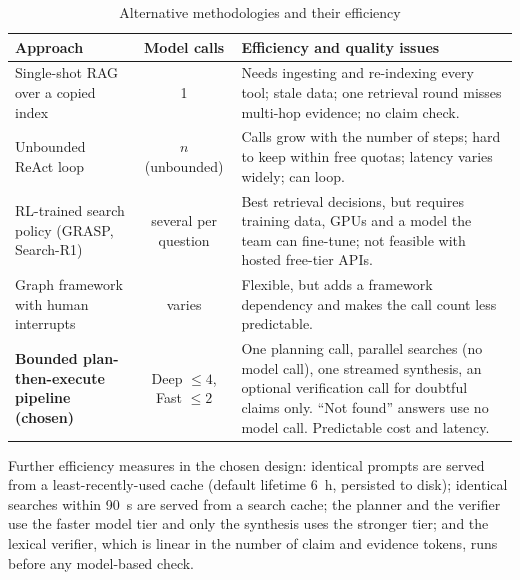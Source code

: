 \documentclass[oneside,a4paper,12pt]{report}
\begin{document}
\begin{table}[!htbp]
\begin{center}
\def\arraystretch{1.3}
\small
\begin{tabularx}{\textwidth}{| p{3.2cm} | c | X |}
\hline
Approach & Model calls & Efficiency and quality issues \\ \hline
Single-shot RAG over a copied index & 1 & Needs ingesting and re-indexing every tool; stale data; one retrieval round misses multi-hop evidence; no claim check. \\ \hline
Unbounded ReAct loop & $n$ (unbounded) & Calls grow with the number of steps; hard to keep within free quotas; latency varies widely; can loop. \\ \hline
RL-trained search policy (GRASP, Search-R1) & several per question & Best retrieval decisions, but requires training data, GPUs and a model the team can fine-tune; not feasible with hosted free-tier APIs. \\ \hline
Graph framework with human interrupts & varies & Flexible, but adds a framework dependency and makes the call count less predictable. \\ \hline
\textbf{Bounded plan-then-execute pipeline (chosen)} & Deep $\le 4$, Fast $\le 2$ & One planning call, parallel searches (no model call), one streamed synthesis, an optional verification call for doubtful claims only. ``Not found'' answers use no model call. Predictable cost and latency. \\ \hline
\end{tabularx}
\end{center}
\caption{Alternative methodologies and their efficiency}
\label{tab:approaches}
\end{table}

Further efficiency measures in the chosen design: identical prompts are served from a least-recently-used cache (default lifetime 6~h, persisted to disk); identical searches within 90~s are served from a search cache; the planner and the verifier use the faster model tier and only the synthesis uses the stronger tier; and the lexical verifier, which is linear in the number of claim and evidence tokens, runs before any model-based check.
\end{document}
